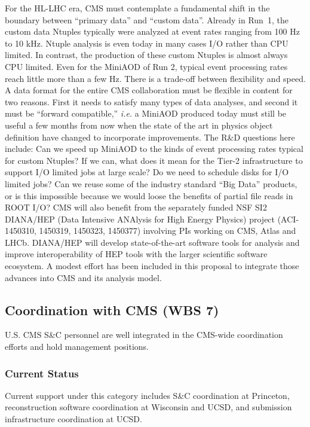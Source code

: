 \documentclass[11pt,a4paper]{article}
\begin{document}
 For the HL-LHC era, CMS must
contemplate a fundamental shift in the boundary between ``primary data''
and ``custom data''.  Already in Run~1, the custom data Ntuples typically
were analyzed at event rates ranging from 100 Hz to 10 kHz.  Ntuple
analysis is even today in many cases I/O rather than CPU limited. In
contrast, the production of these custom Ntuples is almost always CPU
limited. Even for the MiniAOD of Run 2, typical event processing rates
reach little more than a few Hz.  There is a trade-off between flexibility
and speed. A data format for the entire CMS collaboration must be
flexible in content for two reasons. First it needs to satisfy many types
of data analyses, and second it must be ``forward compatible,'' {\it i.e.} a
MiniAOD produced today must still be useful a few months from now when the
state of the art in physics object definition have changed to incorporate improvements. 
The R\&D questions here include: Can we speed up MiniAOD to the kinds of event
processing rates typical for custom Ntuples? If we can, what does it mean
for the Tier-2 infrastructure to support I/O limited jobs at large scale?
Do we need to schedule disks for I/O limited jobs?
Can we reuse some of the industry standard ``Big Data'' products, or is this impossible because we
would loose the benefits of partial file reads in ROOT I/O?
CMS will also benefit from the separately funded NSF SI2 DIANA/HEP (Data 
Intensive ANAlysis for High Energy Physics) project (ACI-1450310, 1450319,
1450323, 1450377) involving PIs working on CMS, Atlas and LHCb.
DIANA/HEP will develop state-of-the-art software tools for analysis and improve
interoperability of HEP tools with the larger scientific software ecosystem.
A modest effort has been included in this proposal to integrate those
advances into CMS and its analysis model.

\subsection{Coordination with CMS (WBS 7)}

U.S. CMS S\&C personnel are well integrated in the CMS-wide coordination
efforts and hold management positions.  

\subsubsection{Current Status}

Current support under this category includes S\&C coordination at
Princeton, reconstruction software coordination at Wisconsin and UCSD, and
submission infrastructure coordination at UCSD.
\end{document}
